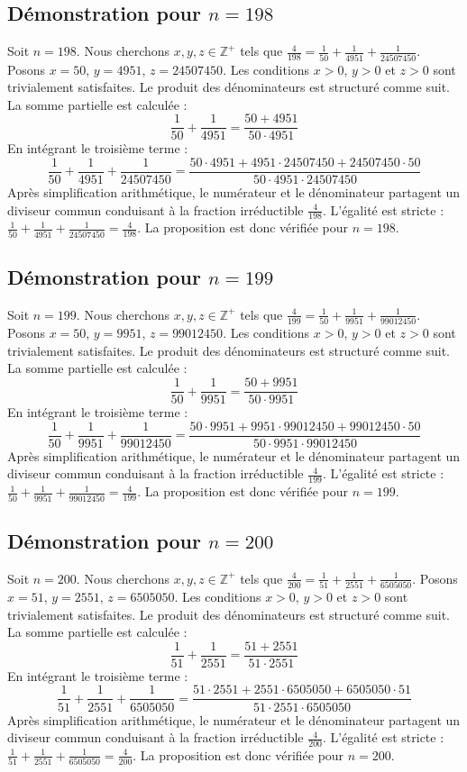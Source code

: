\documentclass[11pt,a4paper]{article}
\begin{document}
\subsection{Démonstration pour $n = 198$}
Soit $n = 198$. Nous cherchons $x, y, z \in \mathbb{Z}^{+}$ tels que $\frac{4}{198} = \frac{1}{50} + \frac{1}{4951} + \frac{1}{24507450}$.
Posons $x = 50$, $y = 4951$, $z = 24507450$.
Les conditions $x > 0$, $y > 0$ et $z > 0$ sont trivialement satisfaites.
Le produit des dénominateurs est structuré comme suit. La somme partielle est calculée :
$$ \frac{1}{50} + \frac{1}{4951} = \frac{50+4951}{50 \cdot 4951} $$
En intégrant le troisième terme :
$$ \frac{1}{50} + \frac{1}{4951} + \frac{1}{24507450} = \frac{50 \cdot 4951 + 4951 \cdot 24507450 + 24507450 \cdot 50}{50 \cdot 4951 \cdot 24507450} $$
Après simplification arithmétique, le numérateur et le dénominateur partagent un diviseur commun conduisant à la fraction irréductible $\frac{4}{198}$.
L'égalité est stricte : $\frac{1}{50} + \frac{1}{4951} + \frac{1}{24507450} = \frac{4}{198}$.
La proposition est donc vérifiée pour $n = 198$.
\subsection{Démonstration pour $n = 199$}
Soit $n = 199$. Nous cherchons $x, y, z \in \mathbb{Z}^{+}$ tels que $\frac{4}{199} = \frac{1}{50} + \frac{1}{9951} + \frac{1}{99012450}$.
Posons $x = 50$, $y = 9951$, $z = 99012450$.
Les conditions $x > 0$, $y > 0$ et $z > 0$ sont trivialement satisfaites.
Le produit des dénominateurs est structuré comme suit. La somme partielle est calculée :
$$ \frac{1}{50} + \frac{1}{9951} = \frac{50+9951}{50 \cdot 9951} $$
En intégrant le troisième terme :
$$ \frac{1}{50} + \frac{1}{9951} + \frac{1}{99012450} = \frac{50 \cdot 9951 + 9951 \cdot 99012450 + 99012450 \cdot 50}{50 \cdot 9951 \cdot 99012450} $$
Après simplification arithmétique, le numérateur et le dénominateur partagent un diviseur commun conduisant à la fraction irréductible $\frac{4}{199}$.
L'égalité est stricte : $\frac{1}{50} + \frac{1}{9951} + \frac{1}{99012450} = \frac{4}{199}$.
La proposition est donc vérifiée pour $n = 199$.
\subsection{Démonstration pour $n = 200$}
Soit $n = 200$. Nous cherchons $x, y, z \in \mathbb{Z}^{+}$ tels que $\frac{4}{200} = \frac{1}{51} + \frac{1}{2551} + \frac{1}{6505050}$.
Posons $x = 51$, $y = 2551$, $z = 6505050$.
Les conditions $x > 0$, $y > 0$ et $z > 0$ sont trivialement satisfaites.
Le produit des dénominateurs est structuré comme suit. La somme partielle est calculée :
$$ \frac{1}{51} + \frac{1}{2551} = \frac{51+2551}{51 \cdot 2551} $$
En intégrant le troisième terme :
$$ \frac{1}{51} + \frac{1}{2551} + \frac{1}{6505050} = \frac{51 \cdot 2551 + 2551 \cdot 6505050 + 6505050 \cdot 51}{51 \cdot 2551 \cdot 6505050} $$
Après simplification arithmétique, le numérateur et le dénominateur partagent un diviseur commun conduisant à la fraction irréductible $\frac{4}{200}$.
L'égalité est stricte : $\frac{1}{51} + \frac{1}{2551} + \frac{1}{6505050} = \frac{4}{200}$.
La proposition est donc vérifiée pour $n = 200$.
\end{document}
